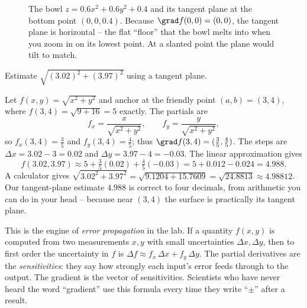 \begin{figure}[H]
\centering
{}
\caption{The bowl $z=0.6x^2+0.6y^2+0.4$ and its tangent plane at the bottom point
$(0,0,0.4)$. Because $\grad f(0,0)=(0,0)$, the tangent plane is horizontal -- the
flat ``floor'' that the bowl melts into when you zoom in on its lowest point. At a
slanted point the plane would tilt to match.}
\label{ch33:fig-plane}
\end{figure}

\begin{example}
\label{ch33:ex-linapprox}
Estimate $\sqrt{(3.02)^2 + (3.97)^2}$ using a tangent plane.

Let $f(x,y)=\sqrt{x^2+y^2}$ and anchor at the friendly point $(a,b)=(3,4)$, where
$f(3,4)=\sqrt{9+16}=5$ exactly. The partials are
\[
  f_x = \frac{x}{\sqrt{x^2+y^2}}, \qquad f_y = \frac{y}{\sqrt{x^2+y^2}},
\]
so $f_x(3,4)=\tfrac35$ and $f_y(3,4)=\tfrac45$; thus $\grad f(3,4)=(\tfrac35,
\tfrac45)$. The steps are $\Delta x = 3.02-3 = 0.02$ and
$\Delta y = 3.97-4 = -0.03$. The linear approximation gives
\[
  f(3.02,3.97)\approx 5 + \tfrac35(0.02) + \tfrac45(-0.03)
  = 5 + 0.012 - 0.024 = 4.988.
\]
A calculator gives $\sqrt{3.02^2+3.97^2}=\sqrt{9.1204+15.7609}=\sqrt{24.8813}
\approx 4.98812$. Our tangent-plane estimate $4.988$ is correct to four decimals,
from arithmetic you can do in your head -- because near $(3,4)$ the surface is
practically its tangent plane.
\end{example}

\begin{connectionbox}
This is the engine of \emph{error propagation} in the lab. If a quantity
$f(x,y)$ is computed from two measurements $x,y$ with small uncertainties
$\Delta x,\Delta y$, then to first order the uncertainty in $f$ is
$\Delta f \approx f_x\,\Delta x + f_y\,\Delta y$. The partial derivatives are the
\emph{sensitivities}: they say how strongly each input's error feeds through to
the output. The gradient is the vector of sensitivities. Scientists who have never
heard the word ``gradient'' use this formula every time they write
``$\pm$'' after a result.
\end{connectionbox}

